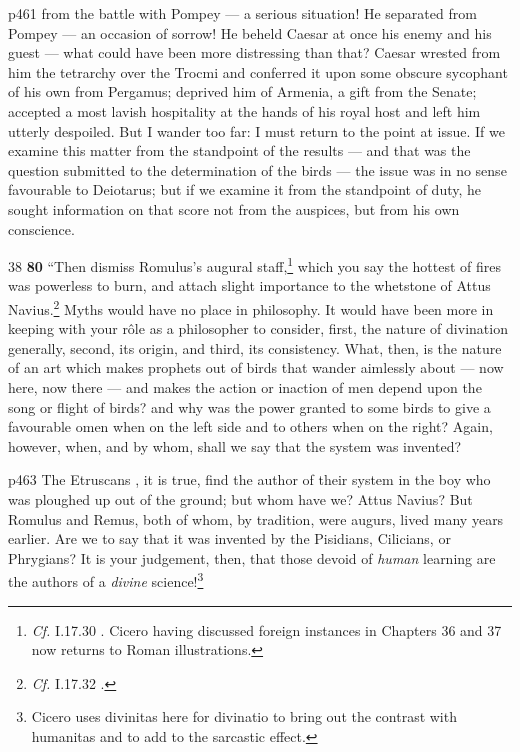 p461 from the battle with Pompey \texthebrew{—} a serious situation! He separated from Pompey \texthebrew{—} an occasion of sorrow! He beheld Caesar at once his enemy and his guest \texthebrew{—} what could have been more distressing than that? Caesar wrested from him the tetrarchy over the Trocmi and conferred it upon some obscure sycophant of his own from Pergamus; deprived him of Armenia, a gift from the Senate; accepted a most lavish hospitality at the hands of his royal host and left him utterly despoiled. But I wander too far: I must return to the point at issue. If we examine this matter from the standpoint of the results \texthebrew{—} and that was the question submitted to the determination of the birds \texthebrew{—} the issue was in no sense favourable to Deiotarus; but if we examine it from the standpoint of duty, he sought information on that score not from the auspices, but from his own conscience.

38
\textbf{80} ``Then dismiss Romulus's augural staff,\texthebrew{}\footnote{\emph{Cf.}
I.17.30 . Cicero having discussed foreign instances in Chapters 36 and 37 now returns to Roman illustrations.

} which you say the hottest of fires was powerless to burn, and attach slight importance to the whetstone of Attus Navius.\texthebrew{}\footnote{\emph{Cf.}
I.17.32 .

} Myths would have no place in philosophy. It would have been more in keeping with your rôle as a philosopher to consider, first, the nature of divination generally, second, its origin, and third, its consistency. What, then, is the nature of an art which makes prophets out of birds that wander aimlessly about \texthebrew{—} now here, now there \texthebrew{—} and makes the action or inaction of men depend upon the song or flight of birds? and why was the power granted to some birds to give a favourable omen when on the left side and to others when on the right? Again, however, when, and by whom, shall we say that the system was invented?

p463 The Etruscans , it is true, find the author of their system in the boy who was ploughed up out of the ground; but whom have we? Attus Navius? But Romulus and Remus, both of whom, by tradition, were augurs, lived many years earlier. Are we to say that it was invented by the Pisidians, Cilicians, or Phrygians? It is your judgement, then, that those devoid of \emph{human} learning are the authors of a \emph{divine} science!\footnote{Cicero uses divinitas here for divinatio to bring out the contrast with humanitas and to add to the sarcastic effect.

}

